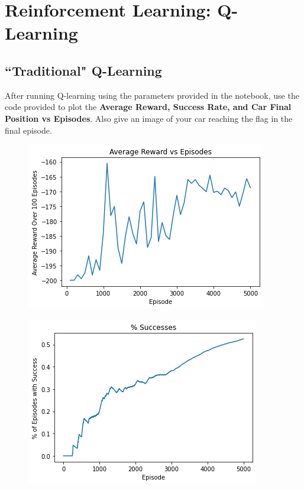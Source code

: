 \section{Reinforcement Learning: Q-Learning}

\subsection {``Traditional" Q-Learning} 

After running Q-learning using the parameters provided in the notebook, use the code provided to plot the \textbf{Average Reward, Success Rate, and Car Final Position vs Episodes}. Also give an image of your car reaching the flag in the final episode.
 

 \begin{figure}[H]
   \centering
     \includegraphics[scale=0.7]
     {templates/avg_reward1}
\end{figure}

 \begin{figure}[H]
   \centering
     \includegraphics[scale=0.7]
     {templates/success1}
 \end{figure}

